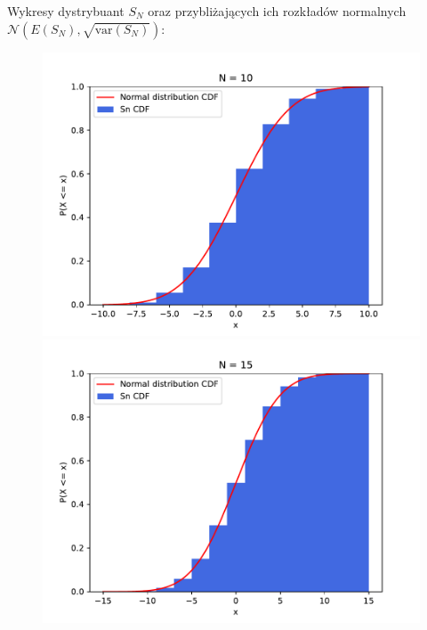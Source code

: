 \documentclass{article}
\begin{document}
Wykresy dystrybuant \( S_N \) oraz przybliżających ich rozkładów normalnych \( \mathcal{N}\left(E\left(S_N\right), \sqrt{\text{var}\left(S_N\right)}\right) \):\\
\begin{figure}[h!]
    \centering
    \begin{minipage}{0.45\textwidth}
        \centering
        \includegraphics[scale=0.5]{./plots/exc2/n10.pdf}
    \end{minipage}%
    \begin{minipage}{0.45\textwidth}
        \centering
        \includegraphics[scale=0.5]{./plots/exc2/n15.pdf}
    \end{minipage}
    

\end{figure}
\end{document}

